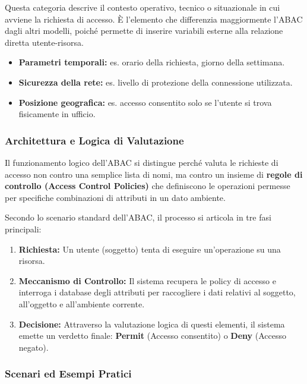 \documentclass{article}
\begin{document}
Questa categoria descrive il contesto operativo, tecnico o situazionale in cui avviene la richiesta di accesso. È l'elemento che differenzia maggiormente l'ABAC dagli altri modelli, poiché permette di inserire variabili esterne alla relazione diretta utente-risorsa.

\begin{itemize}
    \item \textbf{Parametri temporali:} es. orario della richiesta, giorno della settimana.
    \item \textbf{Sicurezza della rete:} es. livello di protezione della connessione utilizzata.
    \item \textbf{Posizione geografica:} es. accesso consentito solo se l'utente si trova fisicamente in ufficio.
\end{itemize}

\vspace{0.8cm}

\subsubsection*{Architettura e Logica di Valutazione}

Il funzionamento logico dell'ABAC si distingue perché valuta le richieste di accesso non contro una semplice lista di nomi, ma contro un insieme di \textbf{regole di controllo (Access Control Policies)} che definiscono le operazioni permesse per specifiche combinazioni di attributi in un dato ambiente.

Secondo lo scenario standard dell'ABAC, il processo si articola in tre fasi principali:

\begin{enumerate}
    \item \textbf{Richiesta:} Un utente (soggetto) tenta di eseguire un'operazione su una risorsa.
    \item \textbf{Meccanismo di Controllo:} Il sistema recupera le policy di accesso e interroga i database degli attributi per raccogliere i dati relativi al soggetto, all'oggetto e all'ambiente corrente.
    \item \textbf{Decisione:} Attraverso la valutazione logica di questi elementi, il sistema emette un verdetto finale: \textbf{Permit} (Accesso consentito) o \textbf{Deny} (Accesso negato).
\end{enumerate}

\vspace{0.5cm}

\subsubsection*{Scenari ed Esempi Pratici}
\end{document}
